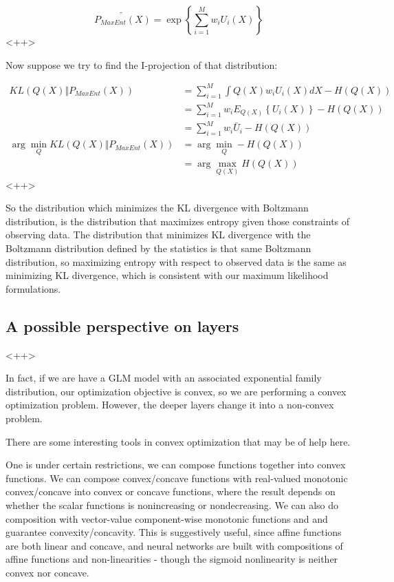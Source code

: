\documentclass[a4paper]{article}
\begin{document}
\begin{equation}
  \tilde{P_{MaxEnt}(X)} = \exp \left\{ \sum_{i=1}^M w_i U_i(X) \right\}
  \label{<++>}
\end{equation}<++>

Now suppose we try to find the I-projection of that distribution:

\begin{equation}
  \begin{split}
    KL\left( Q(X) \Vert P_{MaxEnt}(X) \right) &= \sum_{i=1}^M \int Q(X) w_i U_i(X) dX - H\left( Q(X) \right) \\
    &= \sum_{i=1}^M w_i E_{Q(X)} \left\{ U_i(X) \right\} - H\left( Q(X) \right) \\
    &= \sum_{i=1}^M w_i \bar{U}_i - H\left( Q(X) \right) \\
    \arg \min_{Q} KL\left( Q(X) \Vert P_{MaxEnt}(X) \right) &= \arg \min_{Q} - H\left( Q(X) \right) \\
    &= \arg \max_{Q(X)} H\left( Q(X) \right)
  \end{split}
  \label{<++>}
\end{equation}<++>

So the distribution which minimizes the KL divergence with Boltzmann distribution, is the distribution that maximizes entropy given those constraints of observing data. 
The distribution that minimizes KL divergence with the Boltzmann distribution defined by the statistics is that same Boltzmann distribution, so maximizing entropy with respect to observed data is the same as minimizing KL divergence, which is consistent with our maximum likelihood formulations.

\subsection{A possible perspective on layers}<++>

In fact, if we are have a GLM model with an associated exponential family distribution, our optimization objective is convex, so we are performing a convex optimization problem. 
However, the deeper layers change it into a non-convex problem. 

There are some interesting tools in convex optimization that may be of help here. 

One is under certain restrictions, we can compose functions together into convex functions. 
We can compose convex/concave functions with real-valued monotonic convex/concave into convex or concave functions, where the result depends on whether the scalar functions is nonincreasing or nondecreasing. 
We can also do composition with vector-value component-wise monotonic functions and and guarantee convexity/concavity. 
This is suggestively useful, since affine functions are both linear and concave, and neural networks are built with compositions of affine functions and non-linearities - though the sigmoid nonlinearity is neither convex nor concave.
\end{document}

